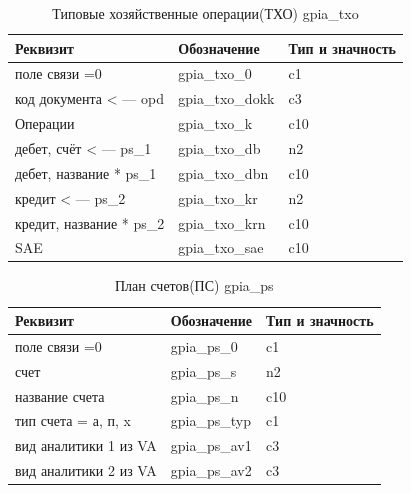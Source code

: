 \begin{table}[h!p]
    \centering
    \scriptsize
    \caption{Типовые хозяйственные операции(ТХО) gpia\_txo}
    \begin{tabular}{|l|l|l|} 

                                                                                           \hline
\textbf{Реквизит}                   &\textbf{Обозначение}   &\textbf{Тип и значность}   \\ \hline
поле связи    =0                    &gpia\_txo\_0           &c1                         \\ \hline
код документа        < ---  opd     &gpia\_txo\_dokk        &c3                         \\ \hline
Операции                            &gpia\_txo\_k           &c10                        \\ \hline
дебет, счёт            < ---  ps\_1 &gpia\_txo\_db          &n2                         \\ \hline
дебет, название       * ps\_1       &gpia\_txo\_dbn         &c10                        \\ \hline
кредит                   < --- ps\_2&gpia\_txo\_kr          &n2                         \\ \hline
кредит, название    * ps\_2         &gpia\_txo\_krn         &c10                        \\ \hline
SAE                                 &gpia\_txo\_sae         &c10                        \\ \hline

    \end{tabular}
\end{table}

\begin{table}[h!p]
    \centering
    \scriptsize
    \caption{План счетов(ПС) gpia\_ps}
    \begin{tabular}{|l|l|l|} 

                                                                                           \hline
\textbf{Реквизит}                   &\textbf{Обозначение}   &\textbf{Тип и значность}   \\ \hline
поле связи        =0                &gpia\_ps\_0            &c1                         \\ \hline
счет                                &gpia\_ps\_s            &n2                         \\ \hline
название счета                      &gpia\_ps\_n            &c10                        \\ \hline
тип счета          = а, п, x        &gpia\_ps\_typ          &c1                         \\ \hline
вид аналитики 1 из VA               &gpia\_ps\_av1          &c3                         \\ \hline
вид аналитики 2 из VA               &gpia\_ps\_av2          &c3                         \\ \hline

    \end{tabular}
\end{table}

